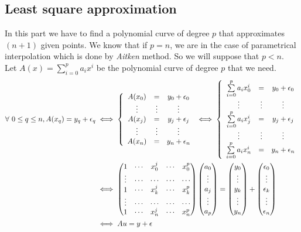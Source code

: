 \documentclass{article}
\begin{document}
\subsection*{Least square approximation}
In this part we have to find a polynomial curve of degree $p$ that approximates $(n+1)$ given points.
We know that if $p=n$, we are in the case of parametrical interpolation which is done by \textit{Aitken}
method. So we will suppose that $p<n$.  \\
Let $\displaystyle A(x) = \sum \limits_{i=0}^{p}a_ix^i$ be the polynomial curve of degree $p$ that we need.
 \begin{align*}
 	\forall \ 0 \le q \le n, A(x_q) = y_q+\epsilon_q 
 	&\iff
 	\left\{
 	\begin{array}{c c c}
 		A(x_0) &=& y_0 + \epsilon_0 \\
 		\vdots &\vdots& \vdots  \\
 		A(x_j) &=& y_j + \epsilon_j \\
 		\vdots &\vdots& \vdots  \\
 		A(x_n) &=& y_n + \epsilon_n
 	\end{array}
 	\right.
 	\iff
 	\left\{
 		\begin{array}{c c c}
 		\sum \limits_{i=0}^{p}a_ix_0^i &=& y_0 + \epsilon_0 \\
 		 \vdots &\vdots& \vdots  \\
 		\sum \limits_{i=0}^{p}a_ix_j^i &=& y_j + \epsilon_j \\
 		\vdots &\vdots& \vdots \\
 		\sum \limits_{i=0}^{p}a_ix_n^i &=& y_n + \epsilon_n
 		\end{array}
 	\right.\\
 	&\iff 
 	\begin{pmatrix}
 		1   & \cdots & x_0^j &  \cdots & x_0^p \\  
 	 \vdots & \cdots & \cdots &  \cdots & \cdots \\
 		1 & \cdots & x_k^j &  \cdots & x_k^p \\
 	 \vdots & \cdots & \cdots &  \cdots & \cdots \\ 		
 		1 & \cdots & x_n^j &  \cdots & x_n^p 
 	\end{pmatrix}
 	\begin{pmatrix}
 		a_0 \\
 		\vdots \\
 		a_j \\
 		\vdots \\
 		a_p
 	\end{pmatrix} =
 	 	\begin{pmatrix}
 		y_0 \\
 		\vdots \\
 		y_k \\
 		\vdots \\
 		y_n
 	\end{pmatrix}+
 	 	\begin{pmatrix}
 		\epsilon_0 \\
 		\vdots \\
 		\epsilon_k \\
 		\vdots \\
 		\epsilon_n
 	\end{pmatrix} \\
 	&\iff Au = y + \epsilon
 \end{align*}
\end{document}
